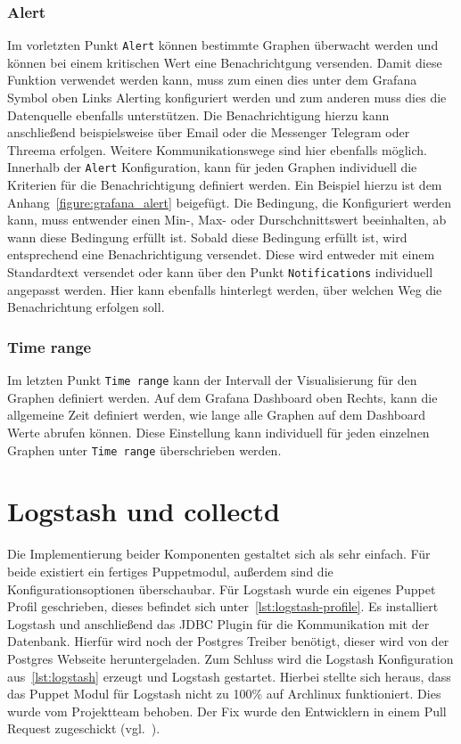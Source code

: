 \subsubsection{Alert}
Im vorletzten Punkt \texttt{Alert} können bestimmte Graphen überwacht werden
und können bei einem kritischen Wert eine Benachrichtgung versenden. Damit
diese Funktion verwendet werden kann, muss zum einen dies unter dem Grafana
Symbol oben Links Alerting konfiguriert werden und zum anderen muss dies die
Datenquelle ebenfalls unterstützen. Die Benachrichtigung hierzu kann
anschließend beispielsweise über Email oder die Messenger Telegram oder Threema
erfolgen. Weitere Kommunikationswege sind hier ebenfalls möglich. Innerhalb der
\texttt{Alert} Konfiguration, kann für jeden Graphen individuell die Kriterien
für die Benachrichtigung definiert werden. Ein Beispiel hierzu ist dem
Anhang~\ref{figure:grafana_alert} beigefügt. Die Bedingung, die Konfiguriert
werden kann, muss entwender einen Min-, Max- oder Durschchnittswert
beeinhalten, ab wann diese Bedingung erfüllt ist. Sobald diese Bedingung
erfüllt ist, wird entsprechend eine Benachrichtigung versendet. Diese wird
entweder mit einem Standardtext versendet oder kann über den Punkt
\texttt{Notifications} individuell angepasst werden. Hier kann ebenfalls
hinterlegt werden, über welchen Weg die Benachrichtung erfolgen soll.
\mr%

\subsubsection{Time range}
Im letzten Punkt \texttt{Time range} kann der Intervall der Visualisierung für
den Graphen definiert werden. Auf dem Grafana Dashboard oben Rechts, kann die
allgemeine Zeit definiert werden, wie lange alle Graphen auf dem Dashboard
Werte abrufen können. Diese Einstellung kann individuell für jeden einzelnen
Graphen unter \texttt{Time range} überschrieben werden.
\mr%

\section{Logstash und collectd}
Die Implementierung beider Komponenten gestaltet sich als sehr einfach. Für
beide existiert ein fertiges Puppetmodul, außerdem sind die
Konfigurationsoptionen überschaubar. Für Logstash wurde ein eigenes Puppet
Profil geschrieben, dieses befindet sich unter~\ref{lst:logstash-profile}. Es
installiert Logstash und anschließend das JDBC Plugin für die Kommunikation mit
der Datenbank. Hierfür wird noch der Postgres Treiber benötigt, dieser wird von
der Postgres Webseite heruntergeladen. Zum Schluss wird die Logstash
Konfiguration aus~\ref{lst:logstash} erzeugt und Logstash gestartet. Hierbei
stellte sich heraus, dass das Puppet Modul für Logstash nicht zu 100\% auf
Archlinux funktioniert. Dies wurde vom Projektteam behoben. Der Fix wurde den
Entwicklern in einem Pull Request zugeschickt (vgl.~\cite{logstash-bug}).

